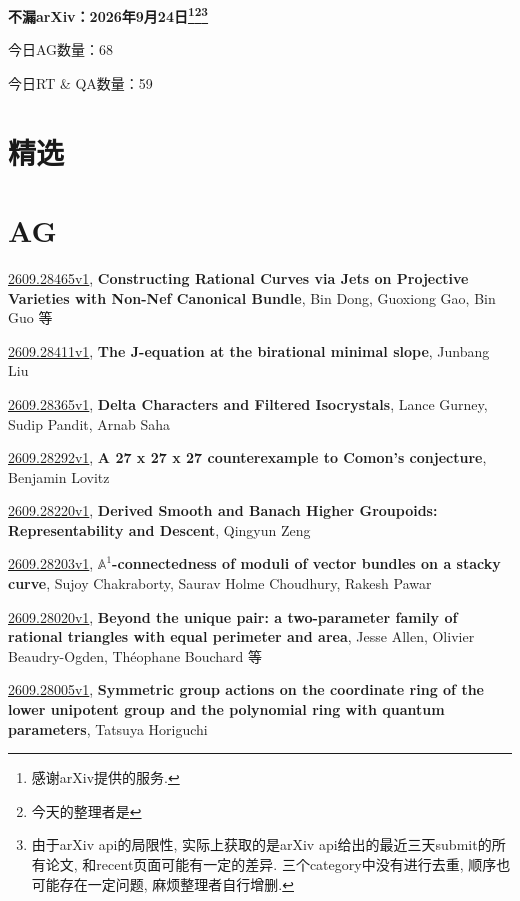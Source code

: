 \documentclass[9pt, a4paper]{article}
\theoremstyle{plain}
\theoremstyle{definition}
\theoremstyle{remark}
\newcommand{\arxiv}[3]{\href{https://arxiv.org/abs/#1}{#1}, \textbf{\textcolor{arxivblue}{#2}}, #3}
\newcommand{\AGnumber}{68}
\newcommand{\RTQAnumber}{59}
\newcommand{\NewestDate}{2026年9月24日}
\newcommand{\todayarXiver}{} %
\begin{document}
\begin{center}
    \Huge\textbf{不漏arXiv：\NewestDate\footnote{感谢arXiv提供的服务.}\footnote{今天的整理者是\todayarXiver}\footnote{由于arXiv api的局限性, 实际上获取的是arXiv api给出的最近三天submit的所有论文, 和recent页面可能有一定的差异. 三个category中没有进行去重, 顺序也可能存在一定问题, 麻烦整理者自行增删.}} \\
\end{center}

\setcounter{section}{-1}

\begin{center}
    今日AG数量：\AGnumber
    
    今日RT \& QA数量：\RTQAnumber
    
\end{center}


\section{精选}


\section{AG}
\arxiv{2609.28465v1}{Constructing Rational Curves via Jets on Projective Varieties with Non-Nef Canonical Bundle}{Bin Dong, Guoxiong Gao, Bin Guo 等}

\arxiv{2609.28411v1}{The J-equation at the birational minimal slope}{Junbang Liu}

\arxiv{2609.28365v1}{Delta Characters and Filtered Isocrystals}{Lance Gurney, Sudip Pandit, Arnab Saha}

\arxiv{2609.28292v1}{A 27 x 27 x 27 counterexample to Comon's conjecture}{Benjamin Lovitz}

\arxiv{2609.28220v1}{Derived Smooth and Banach Higher Groupoids: Representability and Descent}{Qingyun Zeng}

\arxiv{2609.28203v1}{$\mathbb{A}^1$-connectedness of moduli of vector bundles on a stacky curve}{Sujoy Chakraborty, Saurav Holme Choudhury, Rakesh Pawar}

\arxiv{2609.28020v1}{Beyond the unique pair: a two-parameter family of rational triangles with equal perimeter and area}{Jesse Allen, Olivier Beaudry-Ogden, Théophane Bouchard 等}

\arxiv{2609.28005v1}{Symmetric group actions on the coordinate ring of the lower unipotent group and the polynomial ring with quantum parameters}{Tatsuya Horiguchi}
\end{document}
